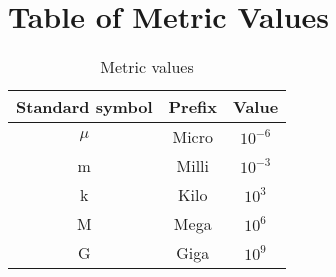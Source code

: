\documentclass{article}
\begin{document}
\section{Table of Metric Values}

\begin{table}[ht]
\caption{Metric values} 
\centering 
\begin{tabular}{ c | c | c} 
\hline 
  Standard symbol & Prefix & Value \\ [0.5ex] 
\hline
$\mu$ & Micro & $10^{-6}$  \\
 m & Milli & $10^{-3}$   \\
 k & Kilo & $10^3$ \\
 M & Mega & $10^6$ \\
 G & Giga & $10^9$ \\
\hline
\end{tabular}
\label{table:nonlin} 
\end{table}
\end{document}
